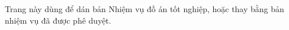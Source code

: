 
\thispagestyle{empty}
\vspace*{\fill}
\begin{center}
Trang này dùng để dán bản Nhiệm vụ đồ án tốt nghiệp, hoặc thay bằng bản nhiệm vụ đã được phê duyệt.
\end{center}
\vspace*{\fill}
\newpage
